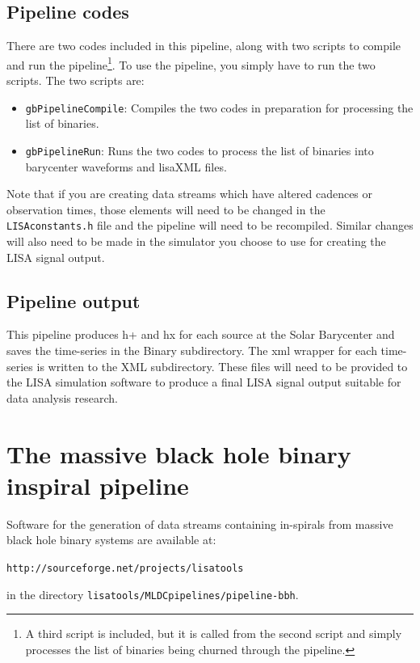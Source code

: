 \documentclass[11pt]{report}
\begin{document}
\subsection{Pipeline codes}
There are two codes included in this pipeline, along with two scripts 
to compile and run the pipeline\footnote{A third script is included,
but it is called from the second script and simply processes the list 
of binaries being churned through the pipeline.}.  To use the
pipeline, you simply have to run the two scripts.  The two scripts
are:
\begin{itemize}
    \item \texttt{gbPipelineCompile}: Compiles the two codes in
    preparation for processing the list of binaries.
    
    \item \texttt{gbPipelineRun}: Runs the two codes to process the
    list of binaries into barycenter waveforms and lisaXML files.
\end{itemize}

Note that if you are creating data streams which have altered cadences
or observation times, those elements will need to be changed in the
\texttt{LISAconstants.h} file and the pipeline will need to be
recompiled.  Similar changes will also need to be made in the
simulator you choose to use for creating the LISA signal output.

\subsection{Pipeline output}
This pipeline produces h+ and hx for each
source at the Solar Barycenter and saves the time-series in
the Binary subdirectory. The xml wrapper for each time-series
is written to the XML subdirectory.  These files will need to be
provided to the LISA simulation software to produce a final LISA
signal output suitable for data analysis research.

\section{The massive black hole binary inspiral pipeline}

Software for the generation of data streams containing in-spirals from massive black hole binary systems are available at:

{\tt http://sourceforge.net/projects/lisatools}

\noindent
in the directory {\tt lisatools/MLDCpipelines/pipeline-bbh}.
\end{document}
